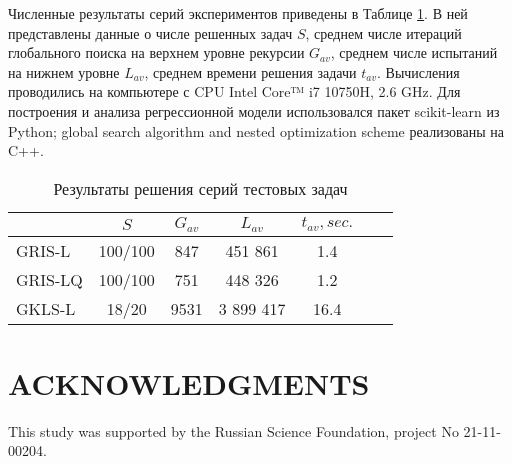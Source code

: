 \documentclass{aip-cp}
\begin{document}
Численные результаты серий экспериментов приведены в Таблице \ref{tab1}. В ней представлены данные о числе решенных задач $S$, среднем числе итераций глобального поиска на верхнем уровне рекурсии $G_{av}$, среднем числе испытаний на нижнем уровне $L_{av}$, среднем времени решения задачи $t_{av}$.
Вычисления проводились на компьютере с CPU Intel Core™ i7 10750H, 2.6 GHz. Для построения и анализа регрессионной модели использовался пакет scikit-learn из Python; global search algorithm and nested optimization scheme реализованы на C++.


\begin{table}[ht]
	\caption{Результаты решения серий тестовых задач}
	\label{tab1}
		\begin{tabular}{ l c c c c c c } \hline
		 & $S$ &  $G_{av}$ &  $L_{av}$ & $t_{av}, sec.$ \\
    \hline
		GRIS-L & 100/100  & 847 &  451 861 & 1.4 \\
		GRIS-LQ & 100/100 & 751 &  448 326 & 1.2 \\
		GKLS-L & 18/20 & 9531 &  3 899 417 & 16.4 \\
		\hline
		\end{tabular}
\end{table}




\section{ACKNOWLEDGMENTS}
This study was supported by the Russian Science Foundation, project No 21-11-00204.




%
%
\end{document}
